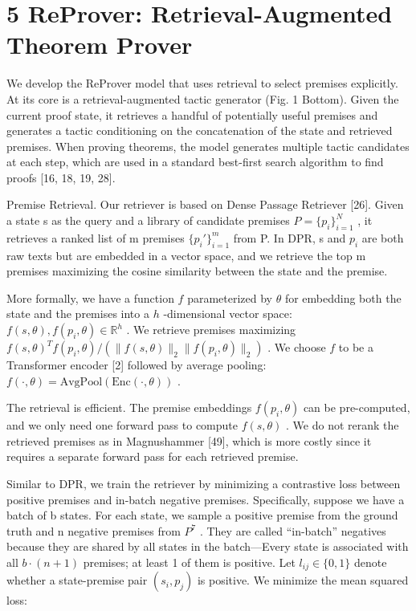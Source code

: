 \documentclass[
]{article}
\begin{document}
\section{5 ReProver: Retrieval-Augmented Theorem
Prover}\label{reprover-retrieval-augmented-theorem-prover}

We develop the ReProver model that uses retrieval to select premises
explicitly. At its core is a retrieval-augmented tactic generator (Fig.
1 Bottom). Given the current proof state, it retrieves a handful of
potentially useful premises and generates a tactic conditioning on the
concatenation of the state and retrieved premises. When proving
theorems, the model generates multiple tactic candidates at each step,
which are used in a standard best-first search algorithm to find proofs
{[}16, 18, 19, 28{]}.

Premise Retrieval. Our retriever is based on Dense Passage Retriever
{[}26{]}. Given a state s as the query and a library of candidate
premises \(P = \{p_i\}_{i=1}^N\) , it retrieves a ranked list of m
premises \(\{p_i'\}_{i=1}^m\) from P. In DPR, s and \(p_i\) are both raw
texts but are embedded in a vector space, and we retrieve the top m
premises maximizing the cosine similarity between the state and the
premise.

More formally, we have a function \(f\) parameterized by \(\theta\) for
embedding both the state and the premises into a \(h\) -dimensional
vector space: \(f(s, \theta), f(p_i, \theta) \in \mathbb{R}^h\) . We
retrieve premises maximizing
\(f(s, \theta)^T f(p_i, \theta) / (\|f(s, \theta)\|_2 \|f(p_i, \theta)\|_2)\)
. We choose \(f\) to be a Transformer encoder {[}2{]} followed by
average pooling:
\(f(\cdot, \theta) = \text{AvgPool}(\text{Enc}(\cdot, \theta))\) .

The retrieval is efficient. The premise embeddings \(f(p_i, \theta)\)
can be pre-computed, and we only need one forward pass to compute
\(f(s, \theta)\) . We do not rerank the retrieved premises as in
Magnushammer {[}49{]}, which is more costly since it requires a separate
forward pass for each retrieved premise.

Similar to DPR, we train the retriever by minimizing a contrastive loss
between positive premises and in-batch negative premises. Specifically,
suppose we have a batch of b states. For each state, we sample a
positive premise from the ground truth and n negative premises from
\(P^{7}\) . They are called ``in-batch'' negatives because they are
shared by all states in the batch---Every state is associated with all
\(b \cdot (n + 1)\) premises; at least 1 of them is positive. Let
\(l_{ij} \in \{0, 1\}\) denote whether a state-premise pair
\((s_i, p_j)\) is positive. We minimize the mean squared loss:
\end{document}
